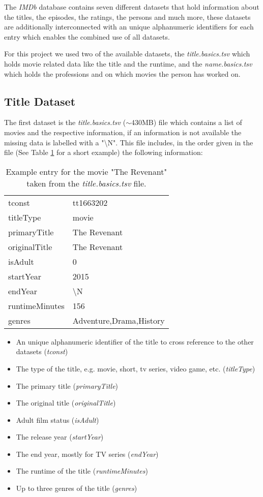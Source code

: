 \documentclass[11pt,a4paper]{article}
\begin{document}
The \emph{IMDb} database contains seven different datasets that hold information about the titles, the episodes, the ratings, the persons and much more, these datasets are additionally interconnected with an unique alphanumeric identifiers for each entry which enables the combined use of all datasets.

For this project we used two of the available datasets, the \emph{title.basics.tsv} which holds movie related data like the title and the runtime, and the \emph{name.basics.tsv} which holds the professions and on which movies the person has worked on.

	\subsection{Title Dataset}

	The first dataset is the \emph{title.basics.tsv} ($\sim$430MB) file which contains a list of movies and the respective information, if an information is not available the missing data is labelled with a "\textbackslash N". This file includes, in the order given in the file (See Table \ref{tab:title} for a short example) the following information:
\begin{table}[H]
		\begin{tabular}{ll}
			\toprule[0.5mm]
			tconst & tt1663202 \\[0.7mm]
			titleType & movie \\[0.7mm]
			primaryTitle & The Revenant \\[0.7mm]
			originalTitle & The Revenant \\[0.7mm]
			isAdult & 0 \\[0.7mm]
			startYear & 2015 \\[0.7mm]
			endYear & \textbackslash N \\[0.7mm]
			runtimeMinutes & 156 \\[0.7mm]
			genres & Adventure,Drama,History \\[0.7mm]
			\bottomrule[0.5mm]
		\end{tabular}
		\caption{Example entry for the movie "The Revenant" taken from the \emph{title.basics.tsv} file.}
		\label{tab:title}
	\end{table}	
	\begin{itemize}
		\item An unique alphanumeric identifier of the title to cross reference to the other datasets (\emph{tconst})
		\item The type of the title, e.g. movie, short, tv series, video game, etc. (\emph{titleType})
		\item The primary title (\emph{primaryTitle})
		\item The original title (\emph{originalTitle})
		\item Adult film status (\emph{isAdult})
		\item The release year (\emph{startYear})
		\item The end year, mostly for TV series (\emph{endYear})
		\item The runtime of the title (\emph{runtimeMinutes})
		\item Up to three genres of the title (\emph{genres})
	\end{itemize}
\end{document}
